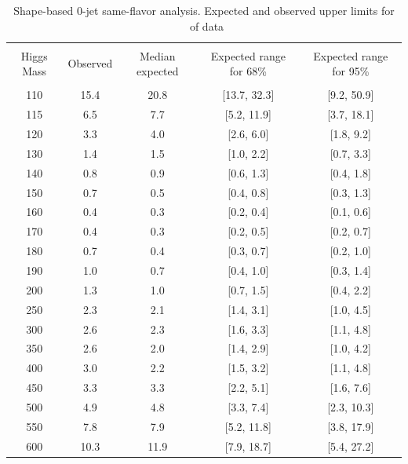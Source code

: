 \begin{table}[!hbp]
\begin{center}
\begin{tabular}{c c c c c}
\hline
\vspace{-3mm} && \\
 Higgs Mass   & Observed & Median expected & Expected range for 68\% & Expected range for 95\%   \\
\vspace{-3mm} && \\
\hline
110 & 15.4 & 20.8 & [13.7, 32.3] & [9.2, 50.9] \\
115 & 6.5 & 7.7 & [5.2, 11.9] & [3.7, 18.1] \\
120 & 3.3 & 4.0 & [2.6, 6.0] & [1.8, 9.2] \\
130 & 1.4 & 1.5 & [1.0, 2.2] & [0.7, 3.3] \\
140 & 0.8 & 0.9 & [0.6, 1.3] & [0.4, 1.8] \\
150 & 0.7 & 0.5 & [0.4, 0.8] & [0.3, 1.3] \\
160 & 0.4 & 0.3 & [0.2, 0.4] & [0.1, 0.6] \\
170 & 0.4 & 0.3 & [0.2, 0.5] & [0.2, 0.7] \\
180 & 0.7 & 0.4 & [0.3, 0.7] & [0.2, 1.0] \\
190 & 1.0 & 0.7 & [0.4, 1.0] & [0.3, 1.4] \\
200 & 1.3 & 1.0 & [0.7, 1.5] & [0.4, 2.2] \\
250 & 2.3 & 2.1 & [1.4, 3.1] & [1.0, 4.5] \\
300 & 2.6 & 2.3 & [1.6, 3.3] & [1.1, 4.8] \\
350 & 2.6 & 2.0 & [1.4, 2.9] & [1.0, 4.2] \\
400 & 3.0 & 2.2 & [1.5, 3.2] & [1.1, 4.8] \\
450 & 3.3 & 3.3 & [2.2, 5.1] & [1.6, 7.6] \\
500 & 4.9 & 4.8 & [3.3, 7.4] & [2.3, 10.3] \\
550 & 7.8 & 7.9 & [5.2, 11.8] & [3.8, 17.9] \\
600 & 10.3 & 11.9 & [7.9, 18.7] & [5.4, 27.2] \\
\hline
\end{tabular}
\caption{Shape-based 0-jet same-flavor analysis. Expected and observed
  upper limits for \intlumi\ of data}
\label{tab:sf0_cut}
\end{center}
\end{table}

